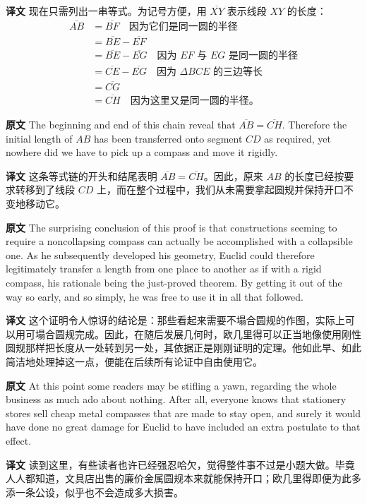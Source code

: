 \documentclass[UTF8,zihao=-4]{ctexart}
\begin{document}
\noindent\textbf{译文} 现在只需列出一串等式。为记号方便，用 $\overline{XY}$ 表示线段 $XY$ 的长度：
\[
\begin{array}{rl}
\overline{AB} &= \overline{BF} \quad \text{因为它们是同一圆的半径}\\
&= \overline{BE}-\overline{EF}\\
&= \overline{BE}-\overline{EG} \quad \text{因为 } EF \text{ 与 } EG \text{ 是同一圆的半径}\\
&= \overline{CE}-\overline{EG} \quad \text{因为 } \Delta BCE \text{ 的三边等长}\\
&= \overline{CG}\\
&= \overline{CH} \quad \text{因为这里又是同一圆的半径。}
\end{array}
\]

\noindent\textbf{原文} The beginning and end of this chain reveal that $\overline{AB}=\overline{CH}$. Therefore the initial length of $AB$ has been transferred onto segment $CD$ as required, yet nowhere did we have to pick up a compass and move it rigidly.

\noindent\textbf{译文} 这条等式链的开头和结尾表明 $\overline{AB}=\overline{CH}$。因此，原来 $AB$ 的长度已经按要求转移到了线段 $CD$ 上，而在整个过程中，我们从未需要拿起圆规并保持开口不变地移动它。

\noindent\textbf{原文} The surprising conclusion of this proof is that constructions seeming to require a noncollapsing compass can actually be accomplished with a collapsible one. As he subsequently developed his geometry, Euclid could therefore legitimately transfer a length from one place to another as if with a rigid compass, his rationale being the just-proved theorem. By getting it out of the way so early, and so simply, he was free to use it in all that followed.

\noindent\textbf{译文} 这个证明令人惊讶的结论是：那些看起来需要不塌合圆规的作图，实际上可以用可塌合圆规完成。因此，在随后发展几何时，欧几里得可以正当地像使用刚性圆规那样把长度从一处转到另一处，其依据正是刚刚证明的定理。他如此早、如此简洁地处理掉这一点，便能在后续所有论证中自由使用它。

\noindent\textbf{原文} At this point some readers may be stifling a yawn, regarding the whole business as much ado about nothing. After all, everyone knows that stationery stores sell cheap metal compasses that are made to stay open, and surely it would have done no great damage for Euclid to have included an extra postulate to that effect.

\noindent\textbf{译文} 读到这里，有些读者也许已经强忍哈欠，觉得整件事不过是小题大做。毕竟人人都知道，文具店出售的廉价金属圆规本来就能保持开口；欧几里得即便为此多添一条公设，似乎也不会造成多大损害。
\end{document}
